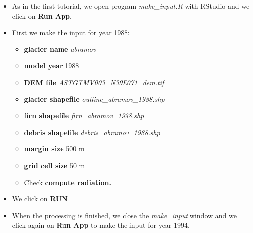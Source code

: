 \documentclass[15pt]{extarticle}
\begin{document}
\begin{itemize}
    \item As in the first tutorial, we open program \textit{make\_input.R} with RStudio and we click on \textbf{Run App}.
    
    \item First we make the input for year 1988:
    \begin{itemize}
        \item \textbf{glacier name} \textit{abramov}
        \item\textbf{model year} 1988
        \item \textbf{DEM file} \textit{ASTGTMV003\_N39E071\_dem.tif}
        \item \textbf{glacier shapefile} \textit{outline\_abramov\_1988.shp}
        \item \textbf{firn shapefile} \textit{firn\_abramov\_1988.shp}
        \item \textbf{debris shapefile} \textit{debris\_abramov\_1988.shp}
        \item \textbf{margin size} 500 m
        \item \textbf{grid cell size} 50 m
        \item Check \textbf{compute radiation.}
    \end{itemize}
    
    \item We click on \textbf{RUN}
    \item When the processing is finished, we close the \textit{make\_input} window and we click again on \textbf{Run App} to make the input for year 1994.
    

\end{itemize}
\end{document}
